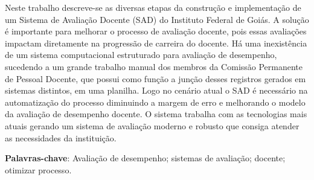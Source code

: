 \begin{resumo}

{\imprimirreferenciaobra}
 
Neste trabalho descreve-se as diversas etapas da construção e implementação de um Sistema de Avaliação Docente (SAD) do Instituto Federal de Goiás. A solução é importante para melhorar o processo de avaliação docente, pois essas avaliações impactam diretamente na progressão de carreira do docente.  
Há uma inexistência de um sistema computacional estruturado para avaliação de desempenho, sucedendo a um grande trabalho manual dos membros da Comissão Permanente de Pessoal Docente, que possui como função a junção desses registros gerados em sistemas distintos, em uma planilha.
Logo no cenário atual o SAD é necessário na automatização do processo diminuindo a margem de erro e melhorando o modelo da avaliação de desempenho docente. O sistema trabalha com as tecnologias mais atuais gerando um sistema de avaliação moderno e robusto que consiga atender as necessidades da instituição.


\textbf{Palavras-chave}: Avaliação de desempenho; sistemas de avaliação; docente; otimizar processo.
\end{resumo} 
